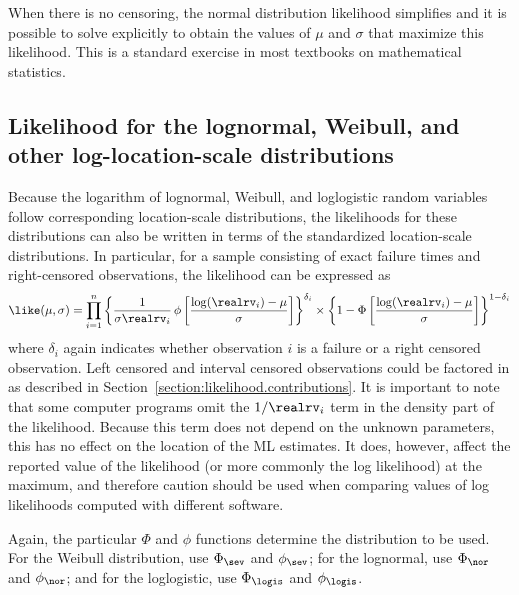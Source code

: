 When there is no censoring, the normal distribution likelihood
simplifies and it is possible to solve explicitly to obtain the values
of $\mu$ and $\sigma$ that maximize this likelihood. This is a
standard exercise in most textbooks on mathematical statistics.
\subsection{Likelihood for the lognormal, Weibull, and other
log-location-scale distributions}
\label{section:exp.loc.scale.like}

Because the logarithm of lognormal, Weibull, and loglogistic random
variables follow corresponding location-scale distributions, the
likelihoods for these distributions can also be written in terms of
the standardized location-scale distributions. In particular, for a
sample consisting of exact failure times and right-censored observations,
the likelihood can be expressed as
\begin{equation}
\label{equation:log.location.scale.likelihood}
\like(\mu,\sigma) = \prod_{i=1}^{n}
\left\{ \frac{1}{\sigma \realrv_{i}} \, \phi
\left[\frac{ \log(\realrv_{i}) -\mu}{\sigma}
\right]
\right\}^{\delta_{i}}
\times
 \left\{1-\Phi \left[\frac{ \log(\realrv_{i}) -\mu}{\sigma}
\right] \right\}^{1-\delta_{i}} 
\end{equation}
where $\delta_{i}$ again indicates whether observation $i$ is a failure or
a right censored observation.  Left censored and interval
censored observations could be factored in as described in
Section~\ref{section:likelihood.contributions}.  It is important to
note that some computer programs omit the $1/\realrv_{i}$ term in the
density part of the likelihood. Because this term does not depend on
the unknown parameters, this has no effect on the location of the ML
estimates. It does, however, affect the reported value of the
likelihood (or more commonly the log likelihood) at the maximum, and
therefore caution should be used when comparing values of
log likelihoods computed with different software.

Again, the particular $\Phi$ and $\phi$ functions determine the
distribution to be used. For the Weibull distribution,
use $\Phi_{\sev}$ and $\phi_{\sev}$; for the lognormal, use
$\Phi_{\nor}$ and $\phi_{\nor}$; and for the loglogistic, use
$\Phi_{\logis}$ and $\phi_{\logis}$.



